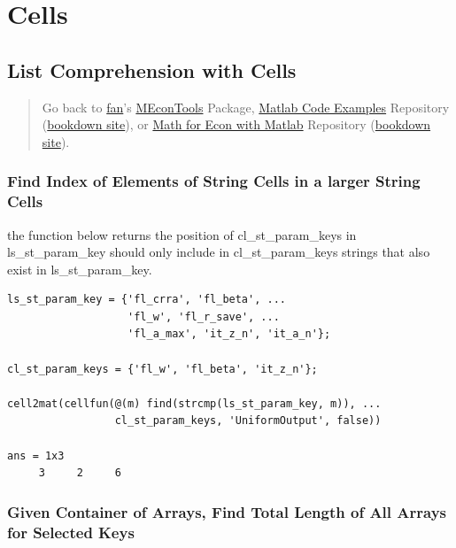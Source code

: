 \documentclass[
]{book}
\begin{document}
\hypertarget{cells}{%
\section{Cells}\label{cells}}

\hypertarget{list-comprehension-with-cells}{%
\subsection{List Comprehension with Cells}\label{list-comprehension-with-cells}}

\begin{quote}
Go back to \href{http://fanwangecon.github.io/}{fan}'s \href{https://fanwangecon.github.io/MEconTools/}{MEconTools} Package, \href{https://fanwangecon.github.io/M4Econ/}{Matlab Code Examples} Repository (\href{https://fanwangecon.github.io/M4Econ/bookdown}{bookdown site}), or \href{https://fanwangecon.github.io/Math4Econ/}{Math for Econ with Matlab} Repository (\href{https://fanwangecon.github.io/Math4Econ/bookdown}{bookdown site}).
\end{quote}

\hypertarget{find-index-of-elements-of-string-cells-in-a-larger-string-cells}{%
\subsubsection{Find Index of Elements of String Cells in a larger String Cells}\label{find-index-of-elements-of-string-cells-in-a-larger-string-cells}}

the function below returns the position of cl\_st\_param\_keys in
ls\_st\_param\_key should only include in cl\_st\_param\_keys strings that
also exist in ls\_st\_param\_key.

\begin{verbatim}
ls_st_param_key = {'fl_crra', 'fl_beta', ...
                   'fl_w', 'fl_r_save', ...
                   'fl_a_max', 'it_z_n', 'it_a_n'};

cl_st_param_keys = {'fl_w', 'fl_beta', 'it_z_n'};

cell2mat(cellfun(@(m) find(strcmp(ls_st_param_key, m)), ...
                 cl_st_param_keys, 'UniformOutput', false))

ans = 1x3    
     3     2     6
\end{verbatim}

\hypertarget{given-container-of-arrays-find-total-length-of-all-arrays-for-selected-keys}{%
\subsubsection{Given Container of Arrays, Find Total Length of All Arrays for Selected Keys}\label{given-container-of-arrays-find-total-length-of-all-arrays-for-selected-keys}}
\end{document}
